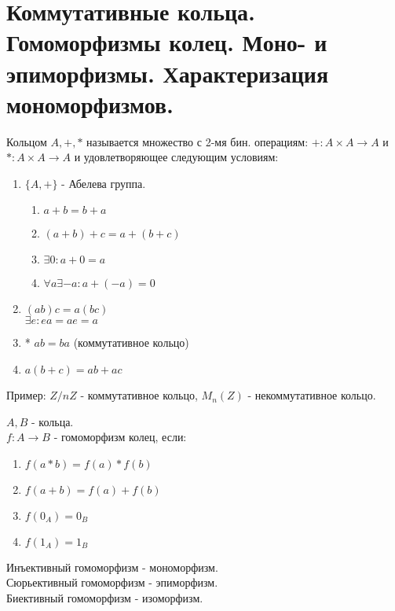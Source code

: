\section{Коммутативные кольца. Гомоморфизмы колец. Моно- и эпиморфизмы. Характеризация мономорфизмов.}

\begin{defn}
Кольцом ${A, +, \ast}$ называется множество с 2-мя бин. операциям: $+: A \times A \rightarrow A$ и
$\ast: A \times A \rightarrow A$ и удовлетворяющее следующим условиям:
\begin{enumerate}
 \item $\{A, +\}$ - Абелева группа.
 \begin{enumerate}
  \item $a + b = b + a$
  \item $(a + b) + c = a + (b + c)$
  \item $\exists0: a + 0 = a$
  \item $\forall a \exists -a: a + (-a) = 0$
 \end{enumerate}

 \item $(ab)c = a(bc)$ \\ $\exists e: ea = ae = a$
 \item * $ab = ba$ (коммутативное кольцо)
 \item $a(b+c) = ab + ac$
\end{enumerate}
\end{defn}

Пример: $Z/nZ$ - коммутативное кольцо, $M_n(Z)$ - некоммутативное кольцо.

\begin{defn}
$A, B$ - кольца.\\
$f: A \rightarrow B$ - гомоморфизм колец, если:
\begin{enumerate}
 \item $f(a \ast b) = f(a) \ast f(b)$
 \item $f(a + b) = f(a) + f(b)$
 \item $f(0_A) = 0_B$
 \item $f(1_A) = 1_B$
\end{enumerate}

\begin{flushleft}
Инъективный гомоморфизм - мономорфизм. \\
Сюрьективный гомоморфизм - эпиморфизм. \\
Биективный гомоморфизм - изоморфизм.
\end{flushleft}
\end{defn}

